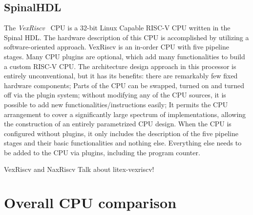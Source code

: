 \subsection{SpinalHDL}
The \textit{VexRiscv}~\cite{vexriscv} CPU is a 32-bit Linux Capable RISC-V CPU written in the Spinal HDL. The hardware description of this CPU is accomplished by utilizing a software-oriented approach. VexRiscv is an in-order CPU with five pipeline stages. Many CPU plugins are optional, which add many functionalities to build a custom RISC-V CPU. The architecture design approach in this processor is entirely unconventional, but it has its benefits: there are remarkably few fixed hardware components; Parts of the CPU can be swapped, turned on and turned off via the plugin system; without modifying any of the CPU sources, it is possible to add new functionalities/instructions easily; It permits the CPU arrangement to cover a significantly large spectrum of implementations, allowing the construction of an entirely parametrized CPU design. When the CPU is configured without plugins, it only includes the description of the five pipeline stages and their basic functionalities and nothing else. Everything else needs to be added to the CPU via plugins, including the program counter.

VexRiscv and NaxRiscv
Talk about litex-vexriscv!


\section{Overall CPU comparison}

